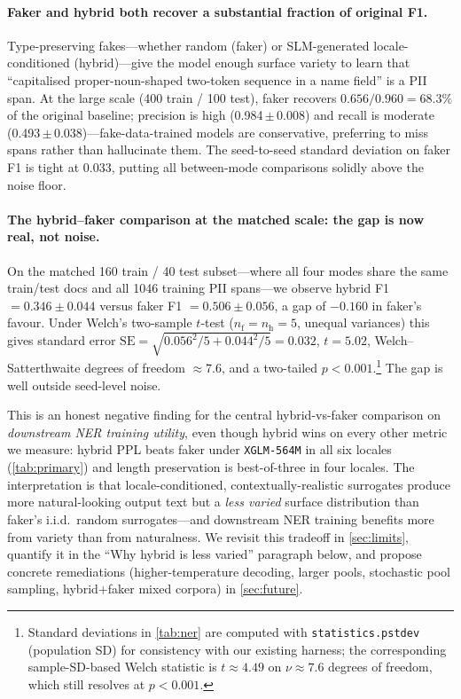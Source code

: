 \documentclass[11pt]{article}
\newcommand{\code}[1]{\texttt{#1}}
\newcommand{\xglm}{\code{XGLM-564M}}
\begin{document}
\paragraph{Faker and hybrid both recover a substantial fraction of
original F1.}
Type-preserving fakes---whether random (faker) or SLM-generated
locale-conditioned (hybrid)---give the model enough surface variety to
learn that ``capitalised proper-noun-shaped two-token sequence in a
name field'' is a PII span. At the large scale (400 train / 100 test),
faker recovers $0.656 / 0.960 = 68.3\%$ of the original baseline;
precision is high (0.984\,$\pm$\,0.008) and recall is moderate
(0.493\,$\pm$\,0.038)---fake-data-trained models are conservative,
preferring to miss spans rather than hallucinate them. The
seed-to-seed standard deviation on faker F1 is tight at 0.033,
putting all between-mode comparisons solidly above the noise floor.

\paragraph{The hybrid--faker comparison at the matched scale: the
gap is now real, not noise.}
On the matched 160 train / 40 test subset---where all four modes
share the same train/test docs and all 1046 training PII spans---we
observe hybrid F1 $= 0.346 \pm 0.044$ versus faker F1 $= 0.506 \pm
0.056$, a gap of \textbf{$-0.160$} in faker's favour. Under Welch's
two-sample $t$-test ($n_{\text{f}}=n_{\text{h}}=5$, unequal variances)
this gives standard error $\mathrm{SE} = \sqrt{0.056^2/5 + 0.044^2/5}
= 0.032$, $t = 5.02$, Welch--Satterthwaite degrees of freedom $\approx
7.6$, and a two-tailed $p < 0.001$.\footnote{Standard deviations in
\cref{tab:ner} are computed with \code{statistics.pstdev} (population
SD) for consistency with our existing harness; the corresponding
sample-SD-based Welch statistic is $t \approx 4.49$ on $\nu \approx
7.6$ degrees of freedom, which still resolves at $p < 0.001$.} The
gap is well outside seed-level noise.

This is an honest negative finding for the central hybrid-vs-faker
comparison on \emph{downstream NER training utility}, even though
hybrid wins on every other metric we measure: hybrid PPL beats faker
under \xglm{} in all six locales (\cref{tab:primary}) and length
preservation is best-of-three in four locales. The interpretation is
that locale-conditioned, contextually-realistic surrogates produce
more natural-looking output text but a \emph{less varied} surface
distribution than faker's i.i.d.\ random surrogates---and downstream
NER training benefits more from variety than from naturalness. We
revisit this tradeoff in \cref{sec:limits}, quantify it in the
``Why hybrid is less varied'' paragraph below, and propose concrete
remediations (higher-temperature decoding, larger pools, stochastic
pool sampling, hybrid$+$faker mixed corpora) in \cref{sec:future}.
\end{document}
